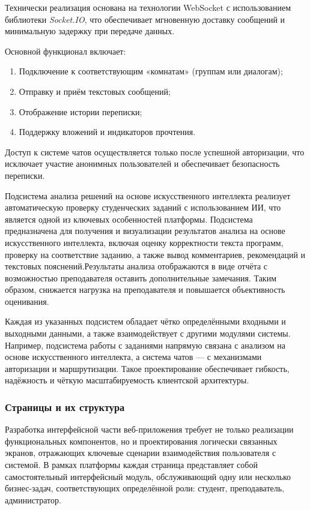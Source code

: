 Технически реализация основана на технологии WebSocket с использованием библиотеки \textit{Socket.IO}, что обеспечивает мгновенную доставку сообщений и минимальную задержку при передаче данных.

Основной функционал включает:
\begin{enumerate}
\item Подключение к соответствующим «комнатам» (группам или диалогам);
\item Отправку и приём текстовых сообщений;
\item Отображение истории переписки;
\item Поддержку вложений и индикаторов прочтения.
\end{enumerate}

Доступ к системе чатов осуществляется только после успешной авторизации, что исключает участие анонимных пользователей и обеспечивает безопасность переписки.

Подсистема анализа решений на основе искусственного интеллекта реализует автоматическую проверку студенческих заданий с использованием ИИ, что является одной из ключевых особенностей платформы.
Подсистема предназначена для получения и визуализации результатов анализа на основе искусственного интеллекта, включая оценку корректности текста программ, проверку на соответствие заданию, а также вывод комментариев, рекомендаций и текстовых пояснений.Результаты анализа отображаются в виде отчёта с возможностью преподавателя оставить дополнительные замечания. Таким образом, снижается нагрузка на преподавателя и повышается объективность оценивания.

Каждая из указанных подсистем обладает чётко определёнными входными и выходными данными, а также взаимодействует с другими модулями системы. Например, подсистема работы с заданиями напрямую связана с анализом на основе искусственного интеллекта, а система чатов — с механизмами авторизации и маршрутизации. Такое проектирование обеспечивает гибкость, надёжность и чёткую масштабируемость клиентской архитектуры.

\subsubsection{Страницы и их структура}

Разработка интерфейсной части веб-приложения требует не только реализации функциональных компонентов, но и проектирования логически связанных экранов, отражающих ключевые сценарии взаимодействия пользователя с системой. В рамках платформы каждая страница представляет собой самостоятельный интерфейсный модуль, обслуживающий одну или несколько бизнес-задач, соответствующих определённой роли: студент, преподаватель, администратор.

